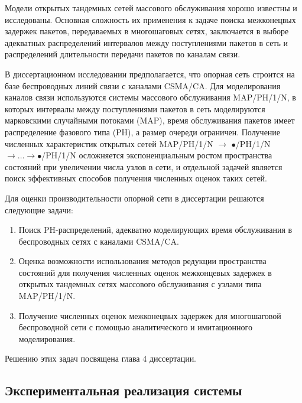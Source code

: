 Модели открытых тандемных сетей массового обслуживания хорошо известны и исследованы. Основная сложность их применения к задаче поиска межконецвых задержек пакетов, передаваемых в многошаговых сетях, заключается в выборе адекватных распределений интервалов между поступлениями пакетов в сеть и распределений длительности передачи пакетов по каналам связи.

В диссертационном исследовании предполагается, что опорная сеть строится на базе беспроводных линий связи с каналами CSMA/CA. Для моделирования каналов связи используются системы массового обслуживания MAP/PH/1/N, в которых интервалы между поступлениями пакетов в сеть моделируются марковскими случайными потоками (MAP), время обслуживания пакетов имеет распределение фазового типа (PH), а размер очереди ограничен. Получение численных характеристик открытых сетей MAP/PH/1/N $\rightarrow$ $\bullet$/PH/1/N $\rightarrow \dots \rightarrow \bullet$/PH/1/N осложняется экспоненциальным ростом пространства состояний при увеличении числа узлов в сети, и отдельной задачей является поиск эффективных способов получения численных оценок таких сетей.

Для оценки производительности опорной сети в диссертации решаются следующие задачи:

\begin{enumerate}
    \item Поиск PH-распределений, адекватно моделирующих время обслуживания в беспроводных сетях с каналами CSMA/CA.
    \item Оценка возможности использования методов редукции пространства состояний для получения численных оценок межконцевых задержек в открытых тандемных сетях массового обслуживания с узлами типа MAP/PH/1/N.
    \item Получение численных оценок межконецвых задержек для многошаговой беспроводной сети с помощью аналитического и имитационного моделирования.
\end{enumerate}

Решению этих задач посвящена глава 4 диссертации.


\subsection{Экспериментальная реализация системы}

